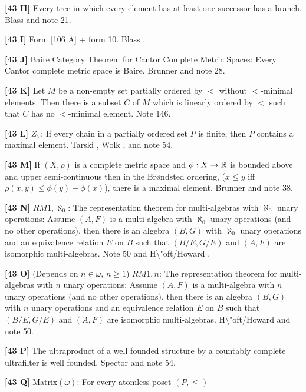 \item{}{\bf [43 H]} Every tree in which every element has at least
one successor has a branch.  \ac{Blass} \cite{1979} and note 21.
\smallskip
\item{}{\bf [43 I]}  Form [106 A] + form 10. \ac{Blass} \cite{1979}.
\smallskip
\item{}{\bf [43 J]}  Baire Category Theorem for Cantor Complete Metric
Spaces: Every Cantor complete metric space is Baire.
\ac{Brunner} \cite{1983c} and note 28.
\smallskip
\item{}{\bf [43 K]}  Let $M$ be a non-empty set partially ordered
by $<$ without $<$-minimal elements.  Then there is a subset $C$
of $M$ which is linearly ordered by $<$ such that $C$ has no
$<$-minimal element.  Note 146.
\smallskip
\item{}{\bf [43 L]}  $Z_{\omega}$: If every chain in a partially ordered
set $P$ is finite, then $P$ contains a maximal element.
\ac{Tarski} \cite{1948}, \ac{Wolk} \cite{1983}, and note 54.
\smallskip
\item{}{\bf [43 M]} If $(X,\rho)$ is a complete metric space and $\phi:
X\rightarrow {\Bbb R}$ is bounded above and upper semi-continuous then in
the Br\o ndsted ordering, ($x\le y$ iff $\rho(x,y)\le\phi(y)-\phi(x)$),
there is a  maximal element.  \ac{Brunner} \cite{1987a} and note 38.
\smallskip
\item{}{\bf [43 N]} $RM1,\aleph_{0}$:  The representation theorem for
multi-algebras with $\aleph_{0}$ unary operations: Assume $(A,F)$ is a
multi-algebra with $\aleph_{0}$ unary operations (and no other operations),
then there is an algebra $(B,G)$ with $\aleph_{0}$ unary operations and
an equivalence relation $E$ on $B$ such that $(B/E,G/E)$ and $(A,F)$ are
isomorphic multi-algebras.  Note 50 and \ac{H\"oft/Howard} \cite{1981}.
\smallskip
\item{}{\bf [43 O]} (Depends on $n\in \omega$, $n\ge 1$) $RM1,n$:  The
representation theorem for multi-algebras with $n$ unary operations:
Assume $(A,F)$ is a multi-algebra with $n$ unary operations (and no
other operations), then there is an algebra $(B,G)$ with $n$ unary
operations and an equivalence relation $E$ on $B$ such that $(B/E,G/E)$
and $(A,F)$ are isomorphic multi-algebras.  \ac{H\"oft/Howard}
\cite{1981} and note 50.
\smallskip
\item{}{\bf [43 P]}  The ultraproduct of a well founded structure by a
countably complete ultrafilter is well founded. \ac{Spector} \cite{1980}
and note 54.
\smallskip
\item{}{\bf [43 Q]} Matrix$(\omega)$: For every atomless poset $(P,\le)$
